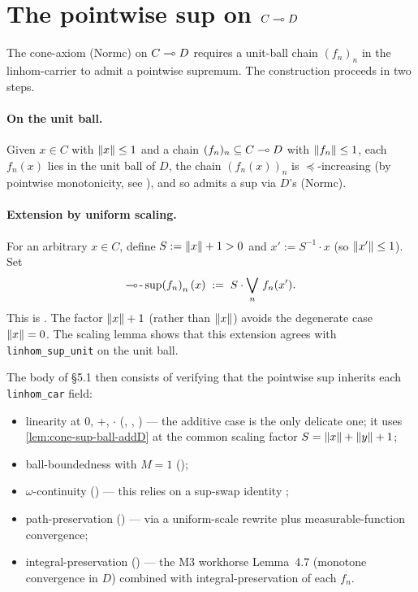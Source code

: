 \section{The pointwise sup on \texorpdfstring{$C \multimap D$}{C -> D}}\label{sec:linhom-sup-fun}

The cone-axiom (Normc) on $C \multimap D$ requires a unit-ball chain
$(f_n)_{n}$ in the linhom-carrier to admit a pointwise supremum.
The construction proceeds in two steps.

\paragraph{On the unit ball.}
Given $x \in C$ with $\lVert x \rVert \le 1$ and a chain
$(f_n)_n \subseteq C \multimap D$ with $\lVert f_n \rVert \le 1$, each
$f_n(x)$ lies in the unit ball of $D$, the chain $(f_n(x))_n$ is
$\preceq$-increasing (by pointwise monotonicity, see
), and so admits a sup
 via $D$'s (Normc).

\paragraph{Extension by uniform scaling.}
For an arbitrary $x \in C$, define
$S := \lVert x \rVert + 1 > 0$ and $x' := S^{-1} \cdot x$ (so
$\lVert x' \rVert \le 1$). Set
\[
  \multimap\!\text{-}\sup\!{(f_n)}_n\,(x) \;:=\; S \cdot
  \bigvee_n\,f_n(x').
\]
This is . The factor
$\lVert x \rVert + 1$ (rather than $\lVert x \rVert$) avoids the degenerate case
$\lVert x \rVert = 0$. The scaling lemma
 shows that this
extension agrees with \texttt{linhom\_sup\_unit} on the unit ball.

The body of \S5.1 then consists of verifying that the pointwise
sup inherits each \texttt{linhom\_car} field:
\begin{itemize}
  \item linearity at $0$, $+$, $\cdot$
    (,
    ,
    ) --- the additive
    case is the only delicate one; it uses
    \autoref{lem:cone-sup-ball-addD} at the common scaling factor
    $S = \lVert x \rVert + \lVert y \rVert + 1$;
  \item ball-boundedness with $M = 1$
    ();
  \item $\omega$-continuity
    () --- this
    relies on a sup-swap identity
    ;
  \item path-preservation
    () --- via a
    uniform-scale rewrite plus measurable-function convergence;
  \item integral-preservation
    () --- the M3
    workhorse Lemma~4.7 (monotone convergence in $D$) combined with
    integral-preservation of each $f_n$.
\end{itemize}

